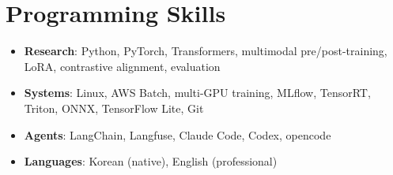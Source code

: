 \documentclass[letterpaper,11pt]{article}
\newcommand{\resumeSubHeadingListStart}{\begin{itemize}[leftmargin=*]}
\newcommand{\resumeSubHeadingListEnd}{\end{itemize}}
\begin{document}
\section{Programming Skills}
 \resumeSubHeadingListStart
   \item{
     \textbf{Research}{: Python, PyTorch, Transformers, multimodal pre/post-training, LoRA, contrastive alignment, evaluation}
   }
   \item{
     \textbf{Systems}{: Linux, AWS Batch, multi-GPU training, MLflow, TensorRT, Triton, ONNX, TensorFlow Lite, Git}
   }
   \item{
     \textbf{Agents}{: LangChain, Langfuse, Claude Code, Codex, opencode}
   }
   \item{
     \textbf{Languages}{: Korean (native), English (professional)}
   }
 \resumeSubHeadingListEnd
\end{document}
